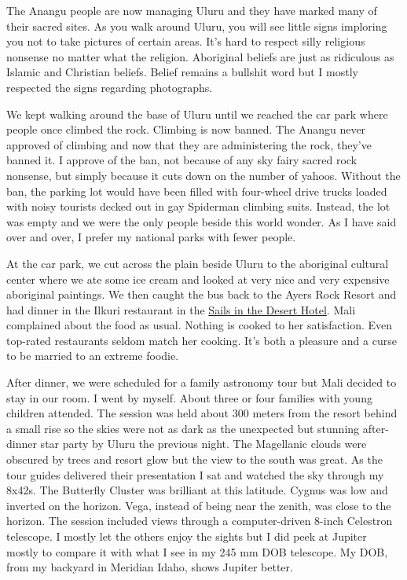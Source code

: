 The Anangu people are now managing Uluru and they have marked many of
their sacred sites. As you walk around Uluru, you will see little signs
imploring you not to take pictures of certain areas. It's hard to
respect silly religious nonsense no matter what the religion. Aboriginal
beliefs are just as ridiculous as Islamic and Christian beliefs. Belief
remains a bullshit word but I mostly respected the signs regarding
photographs.

We kept walking around the base of Uluru until we reached the car park where
people once climbed the rock. Climbing is now banned. The Anangu never
approved of climbing and now that they are administering the rock,
they've banned it. I approve of the ban, not because of any sky fairy
sacred rock nonsense, but simply because it cuts down on the number of
yahoos. Without the ban, the parking lot would have been filled with
four-wheel drive trucks loaded with noisy tourists decked out in gay
Spiderman climbing suits. Instead, the lot was empty and we were the
only people beside this world wonder. As I have said over and over, I
prefer my national parks with fewer people.

At the car park, we cut across the plain beside Uluru to the aboriginal
cultural center where we ate some ice cream and looked at very nice and
very expensive aboriginal paintings. We then caught the bus back to the
Ayers Rock Resort and had dinner in the Ilkuri restaurant in the
\href{https://www.ayersrockresort.com.au/accommodation/sails-in-the-desert}{Sails
in the Desert Hotel}. Mali complained about the food as usual. Nothing
is cooked to her satisfaction. Even top-rated restaurants seldom match
her cooking. It's both a pleasure and a curse to be married to an
extreme foodie.

After dinner, we were scheduled for a family astronomy tour but Mali
decided to stay in our room. I went by myself. About three or four
families with young children attended. The session was held about 300
meters from the resort behind a small rise so the skies were not as dark
as the unexpected but stunning after-dinner star party by Uluru the
previous night. The Magellanic clouds were obscured by trees and resort
glow but the view to the south was great. As the tour guides delivered
their presentation I sat and watched the sky through my 8x42s. The
Butterfly Cluster was brilliant at this latitude. Cygnus was low and
inverted on the horizon. Vega, instead of being near the zenith, was
close to the horizon. The session included views through a
computer-driven 8-inch Celestron telescope. I mostly let the others
enjoy the sights but I did peek at Jupiter mostly to compare it with
what I see in my 245 mm DOB telescope. My DOB, from my backyard in
Meridian Idaho, shows Jupiter better.

